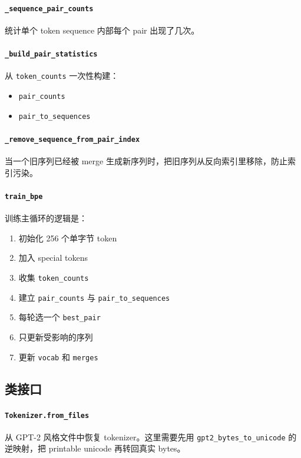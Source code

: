 \documentclass[11pt,a4paper]{ctexart}
\begin{document}
\paragraph{\texttt{\_sequence\_pair\_counts}}
统计单个 token sequence 内部每个 pair 出现了几次。

\paragraph{\texttt{\_build\_pair\_statistics}}
从 \texttt{token\_counts} 一次性构建：
\begin{itemize}[leftmargin=2em]
  \item \texttt{pair\_counts}
  \item \texttt{pair\_to\_sequences}
\end{itemize}

\paragraph{\texttt{\_remove\_sequence\_from\_pair\_index}}
当一个旧序列已经被 merge 生成新序列时，把旧序列从反向索引里移除，防止索引污染。

\paragraph{\texttt{train\_bpe}}
训练主循环的逻辑是：
\begin{enumerate}[leftmargin=2em]
  \item 初始化 256 个单字节 token
  \item 加入 special tokens
  \item 收集 \texttt{token\_counts}
  \item 建立 \texttt{pair\_counts} 与 \texttt{pair\_to\_sequences}
  \item 每轮选一个 \texttt{best\_pair}
  \item 只更新受影响的序列
  \item 更新 \texttt{vocab} 和 \texttt{merges}
\end{enumerate}

\subsection{类接口}
\paragraph{\texttt{Tokenizer.from\_files}}
从 GPT-2 风格文件中恢复 tokenizer。这里需要先用 \texttt{gpt2\_bytes\_to\_unicode} 的逆映射，把 printable unicode 再转回真实 bytes。
\end{document}
